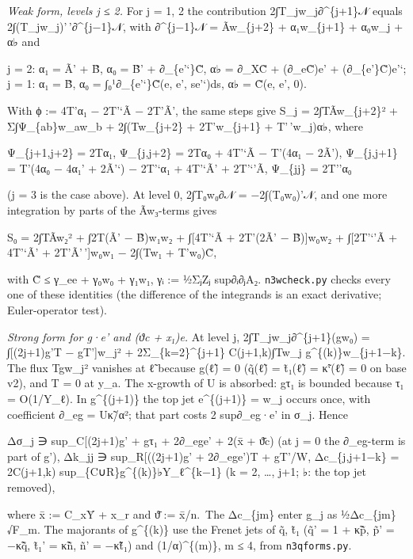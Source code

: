 \documentclass[
]{article}
\begin{document}
\emph{Weak form, levels j ≤ 2.} For j = 1, 2 the contribution
2∫T\_jw\_j∂\^{}\{j+1\}𝒩 equals 2∫(T\_jw\_j)'\,'∂\^{}\{j−1\}𝒩, with
∂\^{}\{j−1\}𝒩 = Ãw\_\{j+2\} + α₁w\_\{j+1\} + α₀w\_j + α♭ and

j = 2: α₁ = Ã' + B̃, α₀ = B̃' + ∂\_\{e'`\}C̃, α♭ = ∂\_XC̃ + (∂\_eC̃)e' +
(∂\_\{e'\}C̃)e'`; j = 1: α₁ = B̃, α₀ = ∫₀¹∂\_\{e'`\}C̃(e, e', se'`)ds, α♭ =
C̃(e, e', 0).

With ϕ := 4T'α₁ − 2T'`Ã − 2T'Ã', the same steps give S\_j =
2∫TÃw\_\{j+2\}² + Σ∫Ψ\_\{ab\}w\_aw\_b + 2∫(Tw\_\{j+2\} + 2T'w\_\{j+1\} +
T'\,'w\_j)α♭, where

Ψ\_\{j+1,j+2\} = 2Tα₁, Ψ\_\{j,j+2\} = 2Tα₀ + 4T'`Ã − T'(4α₁ − 2Ã'),
Ψ\_\{j,j+1\} = T'(4α₀ − 4α₁' + 2Ã'`) − 2T'`α₁ + 4T'`Ã' + 2T'`'Ã,
Ψ\_\{jj\} = 2T''α₀

(j = 3 is the case above). At level 0, 2∫T₀w₀∂𝒩 = −2∫(T₀w₀)'𝒩, and one
more integration by parts of the Ãw₃-terms gives

S₀ = 2∫TÃw₂² + ∫2T(Ã' − B̃)w₁w₂ + ∫{[}4T'`Ã + 2T'(2Ã' − B̃){]}w₀w₂ +
∫{[}2T'`'Ã + 4T'`Ã' + 2T'Ã'\,'{]}w₀w₁ − 2∫(Tw₁ + T'w₀)C̃,

with \textbar C̃\textbar{} ≤ γ\_e\textbar e\textbar{} +
γ₀\textbar w₀\textbar{} + γ₁\textbar w₁\textbar, γᵢ := ½ΣⱼZⱼ
sup\textbar∂ᵢ∂ⱼA₂\textbar. \texttt{n3wcheck.py} checks every one of
these identities (the difference of the integrands is an exact
derivative; Euler-operator test).

\emph{Strong form for g·e' and (ϑc + x₁)e.} At level j,
2∫T\_jw\_j∂\^{}\{j+1\}(gw₀) = ∫{[}(2j+1)g'T − gT'{]}w\_j² +
2Σ\_\{k=2\}\^{}\{j+1\} C(j+1,k)∫Tw\_j g\^{}\{(k)\}w\_\{j+1−k\}. The flux
Tgw\_j² vanishes at ℓ̃ because g(ℓ̃) = 0 (q̃(ℓ̃) = t̃₁(ℓ̃) = κ̃`(ℓ̃) = 0 on base
v2), and T = 0 at y\_a. The x-growth of U is absorbed: gτ₁ is bounded
because τ₁ = O(1/Y\_ℓ). In g\^{}\{(j+1)\} the top jet e\^{}\{(j+1)\} =
w\_j occurs once, with coefficient ∂\_eg = Uκ̃/α²; that part costs 2
sup\textbar∂\_eg·e'\textbar{} in σ\_j. Hence

Δσ\_j ∋ sup\_C{[}(2j+1)\textbar g'\textbar{} +
\textbar g\textbar\textbar τ₁\textbar{} +
2\textbar∂\_eg\textbar\textbar e'\textbar{]} + 2(x̄ +
ϑ̄\textbar c\textbar) (at j = 0 the ∂\_eg-term is part of g'), Δk\_jj ∋
sup\_R{[}((2j+1)\textbar g'\textbar{} +
2\textbar∂\_eg\textbar\textbar e'\textbar)T +
\textbar g\textbar\textbar T'\textbar{]}/W, Δc\_\{j,j+1−k\} = 2C(j+1,k)
sup\_\{C∪R\}\textbar g\^{}\{(k)\}♭\textbar Y\_ℓ\^{}\{k−1\} (k = 2,
\ldots, j+1; ♭: the top jet removed),

where x̄ := C\_xȲ + x\_r and ϑ̄ := x̄/n.~The Δc\_\{jm\} enter g\_j as
½Δc\_\{jm\}√F\_m. The majorants of g\^{}\{(k)\} use the Frenet jets of
q̃, t̃₁ (q̃' = 1 + κ̃p̃, p̃' = −κ̃q̃, t̃₁' = κ̃ñ, ñ' = −κ̃t̃₁) and (1/α)\^{}\{(m)\},
m ≤ 4, from \texttt{n3qforms.py}.
\end{document}
